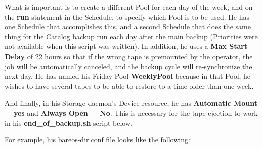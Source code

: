 What is important is to create a different Pool for each day of the week, and
on the {\bf run} statement in the Schedule, to specify which Pool is to be
used. He has one Schedule that accomplishes this, and a second Schedule that
does the same thing for the Catalog backup run each day after the main backup
(Priorities were not available when this script was written). In addition, he
uses a {\bf Max Start Delay} of 22 hours so that if the wrong tape is
premounted by the operator, the job will be automatically canceled, and the
backup cycle will re-synchronize the next day. He has named his Friday Pool
{\bf WeeklyPool} because in that Pool, he wishes to have several tapes to be
able to restore to a time older than one week.

And finally, in his Storage daemon's Device resource, he has {\bf Automatic
Mount = yes} and {\bf Always Open = No}. This is necessary for the tape
ejection to work in his {\bf end\_of\_backup.sh} script below.

For example, his bareos-dir.conf file looks like the following:

